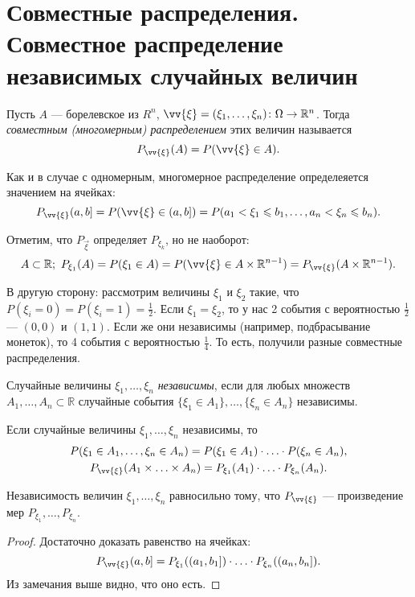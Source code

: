 \section{Совместные распределения. Совместное распределение независимых случайных величин}

\begin{definition}
    Пусть $A$ --- борелевское из $R^n$, 
     $\vv{\xi} = (\xi_1, \ldots, \xi_n) \colon \Omega \rightarrow \mathbb{R}^n$. Тогда \textit{совместным (многомерным) распределением} этих величин называется 
     $$P_{\vv{\xi}}(A) = P(\vv{\xi} \in A).$$
 \end{definition}

Как и в случае с одномерным, многомерное распределение определеяется значением на ячейках:
     $$P_{\vv{\xi}}(a, b] = P(\vv{\xi} \in (a, b]) = P(a_1 < \xi_1 \le b_1, \ldots, a_n < \xi_n \le b_n).$$


     Отметим, что $P_{\overset{\rightarrow}{\xi}}$ определяет $P_{\xi_k}$, но не наоборот:
     $$A\subset\mathbb{R}; \  P_{\xi_1}(A) = P(\xi_1\in A) = P(\vv{\xi}\in A\times\mathbb{R}^{n - 1}) = P_{\vv{\xi}} (A\times\mathbb{R}^{n - 1}).$$


В другую сторону: рассмотрим величины $\xi_1$ и $\xi_2$ такие, что $P(\xi_i = 0) = P(\xi_i = 1) = \frac{1}{2}$.
     Если $\xi_1 = \xi_2$, то у нас 2 события с вероятностью $\frac{1}{2}$ ---  $(0, 0)$ и $(1, 1)$.
     Если же они независимы (например, подбрасывание монеток), то 4 события с вероятностью $\frac{1}{4}$.
     То есть, получили разные совместные распределения.


 \begin{definition}
     Случайные величины $\xi_1, \ldots, \xi_n$ \textit{независимы}, если 
     для любых множеств $A_1, \ldots, A_n \subset \mathbb{R}$ случайные события
     $\{\xi_1\in A_1\}, \ldots, \{\xi_n \in A_n\}$ независимы.
 \end{definition}

\begin{remark}
    Если случайные величины $\xi_1, \ldots, \xi_n$ независимы, то
    \begin{gather*}
        P(\xi_1\in A_1, \ldots, \xi_n\in A_n) = P(\xi_1\in A_1)\cdot\ldots\cdot P(\xi_n\in A_n), \\
        P_{\vv{\xi}}(A_1\times\ldots\times A_n) = P_{\xi_1}(A_1)\cdot\ldots\cdot P_{\xi_n} (A_n).
    \end{gather*}
\end{remark}
    


 \begin{theorem}
     Независимость величин $\xi_1, \ldots, \xi_n$ равносильно тому, что $P_{\vv{\xi}}$ --- произведение мер $P_{\xi_1}, \ldots, P_{\xi_n}$.
 \end{theorem}

 \begin{proof}
     Достаточно доказать равенство на ячейках:
     $$P_{\vv{\xi}}(a, b] = P_{\xi_1}((a_1, b_1])\cdot\ldots\cdot P_{\xi_n}((a_n, b_n]).$$
     Из замечания выше видно, что оно есть.
 \end{proof}
